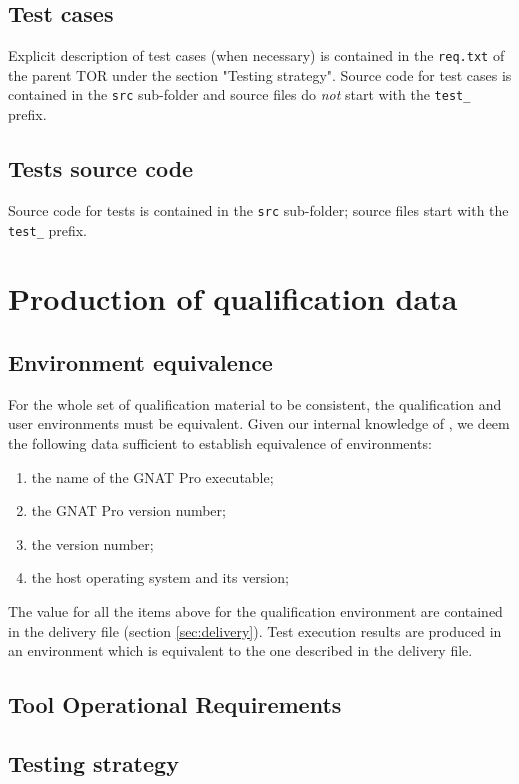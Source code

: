 \documentclass {report}
\begin{document}
\subsection{Test cases}
Explicit description of test cases (when necessary) is contained in the \texttt{req.txt} of the parent TOR under the section "Testing strategy". Source code for test cases is contained in the \texttt{src} sub-folder and source files do \emph{not} start with the \texttt{test\_} prefix. 

\subsection{Tests source code}
Source code for tests is contained in the \texttt{src} sub-folder; source files start with the \texttt{test\_} prefix. 

\section{Production of qualification data}

\subsection{Environment equivalence}
\label{sec:equivalence}
For the whole set of qualification material to be consistent, the qualification and user environments must be equivalent. Given our internal knowledge of \xcov, we deem the following data sufficient to establish equivalence of environments:
\begin{enumerate}
\item the name of the GNAT Pro executable;
\item the GNAT Pro version number;
\item the \xcov version number;
\item the host operating system and its version;
\end{enumerate}
The value for all the items above for the qualification environment are contained in the delivery file (section \ref{sec:delivery}). Test execution results are produced in an environment which is equivalent to the one described in the delivery file. 

\subsection{Tool Operational Requirements}
\subsection{Testing strategy}
\end{document}
